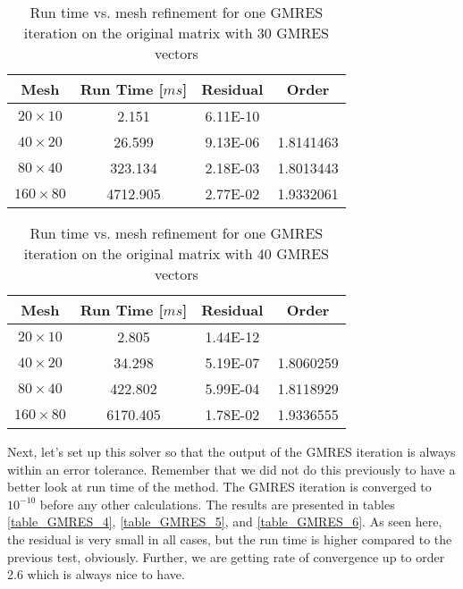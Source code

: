 \documentclass{article}
\begin{document}
\begin{table}[H]
\centering
\caption{Run time vs. mesh refinement for one GMRES iteration on the original matrix with 30 GMRES vectors}
\label{table_GMRES_2}
\begin{tabular}{cccc}
\hline
Mesh & Run Time [$m s$] & Residual & Order\\
\hline\hline
$20 \times 10$  & 2.151    & 6.11E-10 &           \\
$40 \times 20$  & 26.599   & 9.13E-06 & 1.8141463 \\
$80 \times 40$  & 323.134  & 2.18E-03 & 1.8013443 \\
$160 \times 80$ & 4712.905 & 2.77E-02 & 1.9332061 \\
\hline
\end{tabular}
\end{table}

\begin{table}[H]
\centering
\caption{Run time vs. mesh refinement for one GMRES iteration on the original matrix with 40 GMRES vectors}
\label{table_GMRES_3}
\begin{tabular}{cccc}
\hline
Mesh & Run Time [$m s$] & Residual & Order\\
\hline\hline
$20 \times 10$  & 2.805    & 1.44E-12 &           \\
$40 \times 20$  & 34.298   & 5.19E-07 & 1.8060259 \\
$80 \times 40$  & 422.802  & 5.99E-04 & 1.8118929 \\
$160 \times 80$ & 6170.405 & 1.78E-02 & 1.9336555 \\
\hline
\end{tabular}
\end{table}

Next, let's set up this solver so that the output of the GMRES iteration is always within an error tolerance. Remember that we did not do this previously to have a better look at run time of the method. The GMRES iteration is converged to $10^{-10}$ before any other calculations. The results are presented in tables \ref{table_GMRES_4}, \ref{table_GMRES_5}, and \ref{table_GMRES_6}. As seen here, the residual is very small in all cases, but the run time is higher compared to the previous test, obviously. Further, we are getting rate of convergence up to order 2.6 which is always nice to have.
\end{document}

